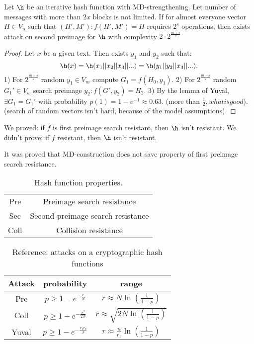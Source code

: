 \begin{theorem}
    Let $\h$ be an iterative hash function with MD-strengthening.
    Let number of messages with more than $2x$ blocks is not limited.
    If for almost everyone vector $H \in V_n$ such that $(H', M'): f(H', M') = H$
    requires $2^s$ operations, then exists attack on second preimage for $\h$ with
    complexity $2 \cdot 2^{\frac{m + s}{2}}$
\end{theorem}
\begin{proof}
    Let $x$ be a given text. Then exists $y_1$ and $y_2$ such that:
    $$\h(x) = \h(x_1 || x_2 || x_3 || ...) = \h(y_1 || y_2 || x_3 || ...).$$
    1) For $2^{\frac{m + s}{2}}$ random $y_1 \in V_m$ compute $G_1 = f(H_0, y_1)$.
    2) For $2^{\frac{m - s}{2}}$ random $G_1'\in V_w$ search preimage
        $y_2: f(G', y_2) = H_2$.
    3) By the lemma of Yuval, $\exists G_1 = G_1'$ with probability
        $p(1) = 1 - e^{-1} \approx 0.63$. (more than $\frac{1}{2}, what is good$).
        (search of random vectors isn't hard, because of the model assumptions).
\end{proof}

\begin{remark}
    We proved: if $f$ is first preimage search resistant, then $\h$ isn't resistant.
    We didn't prove: if $f$ resistant, then $\h$ isn't resistant. 
\end{remark}

It was proved that MD-construction does not save property of first preimage search
resistance.


\begin{table}[ht]
    \centering
    \begin{tabular}{c|c}
        Pre & Preimage search resistance \\
        Sec & Second preimage search resistance \\
        Coll & Collision resistance \\
    \end{tabular}
    \caption{Hash function properties.}
    \label{tab:my_label}
\end{table}



\begin{table}[ht]
    \centering
    \begin{tabular}{c|c|c}
        Attack & probability & range \\ \hline\hline
        Pre   & $p \geqslant 1 - e^{-\frac{r}{N}}$ & $r \approx N \ln(\frac{1}{1 - p})$\\
        Coll  & $p \geqslant 1 - e^{-\frac{r^2}{2N}}$ & $r \approx \sqrt{2 N \ln(\frac{1}{1 - p})}$\\
        Yuval & $p \geqslant 1 - e^{-\frac{r_1 r_2}{N}}$ & $r \approx \frac{n}{r_1} \ln(\frac{1}{1 - p})$
    \end{tabular}
    \caption{Reference: attacks on a cryptographic hash functions}
    \label{tab:reference_attacks}
\end{table}

